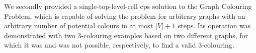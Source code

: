 We secondly provided a single-top-level-cell \gls{cps} solution to the Graph Colouring Problem, which is capable of solving the problem for arbitrary graphs with an arbitrary number of potential colours in at most \(|V| + 1\) steps.  Its operation was demonstrated with two 3-colouring examples based on two different graphs, for which it was and was not possible, respectively, to find a valid 3-colouring.





% 

